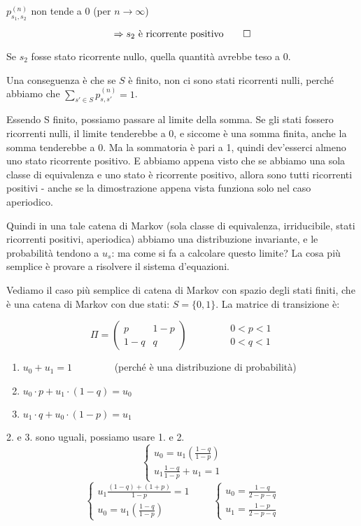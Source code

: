\documentclass[a4paper,12pt]{book}
\newcommand\ddfrac[2]{\frac{\displaystyle #1}{\displaystyle #2}}
\begin{document}
$ p_{s_1,s_2}^{(n)} $ non tende a 0 (per $ n \to \infty $)

$$ \Rightarrow s_2 \text{ è ricorrente positivo} \qed $$

Se $ s_2 $ fosse stato ricorrente nullo, quella quantità avrebbe teso a 0.

Una conseguenza è che se $ S $ è finito, non ci sono stati ricorrenti nulli, perché abbiamo che $ \sum_{s' \in S} p_{s,s'}^{(n)} = 1 $.


Essendo S finito, possiamo passare al limite della somma. Se gli stati fossero ricorrenti nulli, il limite tenderebbe a 0, e siccome è una somma finita, anche la somma tenderebbe a 0. Ma la sommatoria è pari a 1, quindi dev'esserci almeno uno stato ricorrente positivo. E abbiamo appena visto che se abbiamo una sola classe di equivalenza e uno stato è ricorrente positivo, allora sono tutti ricorrenti positivi - anche se la dimostrazione appena vista funziona solo nel caso aperiodico. 

Quindi in una tale catena di Markov (sola classe di equivalenza, irriducibile, stati ricorrenti positivi, aperiodica) abbiamo una distribuzione invariante, e le probabilità tendono a $ u_s $: ma come si fa a calcolare questo limite? La cosa più semplice è provare a risolvere il sistema d'equazioni.

Vediamo il caso più semplice di catena di Markov con spazio degli stati finiti, che è una catena di Markov con due stati: $ S = \{0,1\} $. La matrice di transizione è:

$$ \Pi = \left(\begin{matrix}
	p & 1-p \\
	1-q & q
	\end{matrix}\right)  \qquad \qquad 
	\begin{array}{c} 
		0 < p < 1 \\ 
		0 < q < 1 
	\end{array}
$$

\begin{enumerate}
	\item $ u_0 + u_1 = 1 \qquad \qquad $ (perché è una distribuzione di probabilità)
	\item $u_0 \cdot p + u_1 \cdot (1-q) = u_0 $
	\item $u_1 \cdot q + u_0 \cdot (1-p) = u_1 $
\end{enumerate}

2. e 3. sono uguali, possiamo usare 1. e 2. 
$$ \begin{cases*}
	u_0 = u_1\left(\ddfrac{1-q}{1-p}\right) \\
	u_1\ddfrac{1-q}{1-p} + u_1 = 1
\end{cases*}$$
$$  
	\begin{cases*}
		u_1 \ddfrac{(1-q)+(1+p)}{1-p} = 1 \\
		u_0 = u_1(\ddfrac{1-q}{1-p})
	\end{cases*}
	\qquad 
	\begin{cases*}
		u_0 = \ddfrac{1-q}{2-p-q} \\
		u_1 = \ddfrac{1-p}{2-p-q} 
	\end{cases*}
$$
\end{document}
